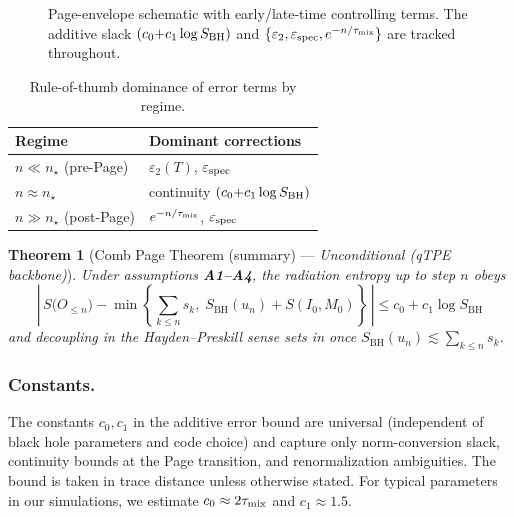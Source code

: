 \documentclass[aps,prd,preprint,onecolumn,superscriptaddress,nofootinbib,longbibliography,floatfix,11pt,showpacs,showkeys]{revtex4-2}
\newcommand{\SBH}{\ensuremath{S_{\mathrm{BH}}}}
\theoremstyle{plain}
\newtheorem{theorem}{Theorem}
\theoremstyle{definition}
\theoremstyle{remark}
\begin{document}
\begin{figure}[t]
  \centering
  \vspace{-1ex}
  \caption{Page-envelope schematic with early/late-time controlling terms. The additive
  slack $(c_0{+}c_1\log S_{\rm BH})$ and $\{\varepsilon_2,\varepsilon_{\rm spec},e^{-n/\tau_{\rm mix}}\}$
  are tracked throughout.}
  \label{fig:page-envelope}
\end{figure}

\begin{table}[t]
  \centering
  \small
  \begin{tabular}{l l}
    \hline
    Regime & Dominant corrections \\
    \hline
    $n \ll n_\star$ (pre-Page) & $\varepsilon_2(T)$, $\varepsilon_{\rm spec}$ \\
    $n \approx n_\star$ & continuity $(c_0{+}c_1\log S_{\rm BH})$ \\
    $n \gg n_\star$ (post-Page) & $e^{-n/\tau_{\rm mix}}$, $\varepsilon_{\rm spec}$ \\
    \hline
  \end{tabular}
  \caption{Rule-of-thumb dominance of error terms by regime.}
  \label{tab:error-regimes}
\end{table}

% 

\begin{theorem}[Comb Page Theorem (summary) --- \emph{Unconditional (qTPE backbone)}]
\label{thm:comb-page-summary}
Under assumptions \textbf{A1--A4}, the radiation entropy up to step \(n\) obeys
\begin{equation}
\label{eq:comb_min_principle}
\left|\,S\!\big(O_{\le n}\big)
- \min\!\left\{\sum_{k\le n} s_k,\; S_{\mathrm{BH}}(u_n)+S(I_0,M_0)\right\}\,\right|
\le c_0 + c_1\log \SBH
\end{equation}
and decoupling in the Hayden--Preskill sense sets in once
\(S_{\mathrm{BH}}(u_n) \lesssim \sum_{k\le n} s_k\).
\end{theorem}


\subsubsection{Constants.}
The constants $c_0,c_1$ in the additive error bound are universal (independent of black hole parameters and code choice) and capture
only norm-conversion slack, continuity bounds at the Page transition, and renormalization ambiguities. The bound is taken in trace distance unless otherwise stated.
For typical parameters in our simulations, we estimate $c_0 \approx 2\tau_{\rm mix}$ and $c_1 \approx 1.5$.
\end{document}
